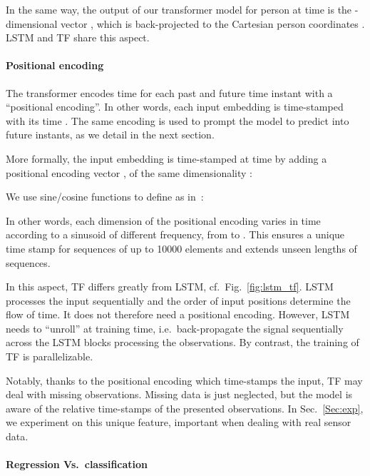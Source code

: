 \documentclass[a4paper,conference]{IEEEtran}
\begin{document}
In the same way, the output of our transformer model for person  at time  is the -dimensional vector , which is back-projected to the Cartesian person coordinates . LSTM and TF share this aspect.













\paragraph{Positional encoding}
The transformer encodes time for each past and future time instant  with a ``positional encoding''. In other words, each input embedding  is time-stamped with its time . The same encoding is used to prompt the model to predict into future instants, as we detail in the next section.

More formally, the input embedding  is time-stamped at time  by adding a positional encoding vector , of the same dimensionality :



We use sine/cosine functions to define  as in~\cite{TransformersNIPS17}:

In other words, each dimension of the positional encoding varies in time according to a sinusoid of different frequency, from  to . This ensures a unique time stamp for sequences of up to 10000 elements and extends unseen lengths of sequences. 

In this aspect, TF differs greatly from LSTM, cf.\ Fig.~\ref{fig:lstm_tf}. LSTM processes the input sequentially and the order of input positions determine the flow of time. It does not therefore need a positional encoding. However, LSTM needs to ``unroll'' at training time, i.e.\ back-propagate the signal sequentially across the LSTM blocks processing the observations. By contrast, the training of TF is parallelizable.


Notably, thanks to the positional encoding which time-stamps the input, TF may deal with missing observations.  Missing data is just neglected, but the model is aware of the relative time-stamps of the presented observations. In Sec.~\ref{Sec:exp}, we experiment on this unique feature, important when dealing with real sensor data.

\paragraph{Regression Vs.\ classification}
\end{document}
